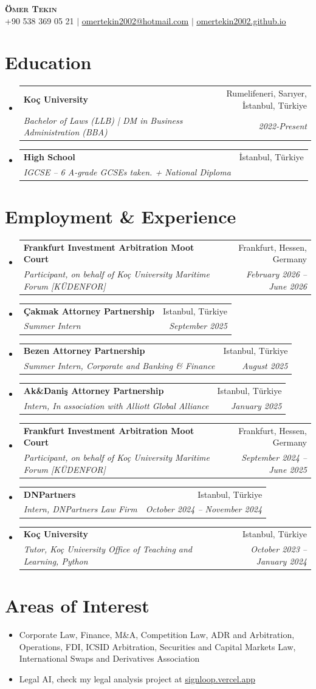\documentclass[letterpaper,11pt]{article}
\makeatletter
\newcommand{\resumeItem}[1]{\item\small{{
    {#1 \vspace{-2pt}}
  }}}
\newcommand{\resumeSubheading}[4]{\vspace{-2pt}\item
    \begin{tabular*}{0.97\textwidth}[t]{l@{\extracolsep{\fill}}r}
      \textbf{#1} & #2 \\[-3pt]
      \textit{\small#3} & \textit{\small #4} \\
    \end{tabular*} \vspace{-2.5pt}
}
\newcommand{\resumeSubHeadingListStart}{\begin{itemize}[leftmargin=0.15in, label={}, itemsep=0pt, parsep=0pt]}
\newcommand{\resumeSubHeadingListEnd}{\end{itemize}\vspace{-25pt}}
\newcommand{\resumeItemListStart}{\begin{itemize}[parsep=0pt]}
\newcommand{\resumeItemListEnd}{\end{itemize}\vspace{-27pt}}
\makeatother
\begin{document}
\begin{center}
    \textbf{\Huge \scshape Ömer Tekin} \\ \vspace{1pt}
    \small +90 538 369 05 21 $|$ \href{mailto:omertekin2002@hotmail.com}{\underline{omertekin2002@hotmail.com}} $|$ 
    \href{https://omertekin2002.github.io}{\underline{omertekin2002.github.io}}
\end{center}


\section{Education}
  \resumeSubHeadingListStart
    \resumeSubheading
      {Koç University}{Rumelifeneri, Sarıyer, İstanbul, Türkiye}
      {Bachelor of Laws (LLB) | DM in Business Administration (BBA)}{2022-Present}
    \resumeSubheading
      {High School}{İstanbul, Türkiye}
      {IGCSE – 6 A-grade GCSEs taken. + National Diploma}{}
  \resumeSubHeadingListEnd


\section{Employment \& Experience}
  \resumeSubHeadingListStart
    \resumeSubheading
      {Frankfurt Investment Arbitration Moot Court}{Frankfurt, Hessen, Germany}
      {Participant, on behalf of Koç University Maritime Forum [KÜDENFOR]}{February 2026 – June 2026}
    \resumeSubheading
      {Çakmak Attorney Partnership}{Istanbul, Türkiye}
      {Summer Intern}{September 2025}
    \resumeSubheading
      {Bezen Attorney Partnership}{Istanbul, Türkiye}
      {Summer Intern, Corporate and Banking \& Finance}{August 2025}
    \resumeSubheading
      {Ak\&Daniş Attorney Partnership}{Istanbul, Türkiye}
      {Intern, In association with Alliott Global Alliance}{January 2025}
    \resumeSubheading
      {Frankfurt Investment Arbitration Moot Court}{Frankfurt, Hessen, Germany}
      {Participant, on behalf of Koç University Maritime Forum [KÜDENFOR]}{September 2024 – June 2025}
    \resumeSubheading
      {DNPartners}{Istanbul, Türkiye}
      {Intern, DNPartners Law Firm}{October 2024 – November 2024}
    \resumeSubheading
      {Koç University}{Istanbul, Türkiye}
      {Tutor, Koç University Office of Teaching and Learning, Python}{October 2023 – January 2024}
  \resumeSubHeadingListEnd

\section{Areas of Interest}
\resumeItemListStart
    \resumeItem{Corporate Law, Finance, M\&A, Competition Law, ADR and Arbitration, Operations, FDI, ICSID Arbitration, Securities and Capital Markets Law, International Swaps and Derivatives Association}
    \resumeItem{Legal AI, check my legal analysis project at \href{https://signloop.vercel.app}{\underline{signloop.vercel.app}}}
\resumeItemListEnd
\end{document}
